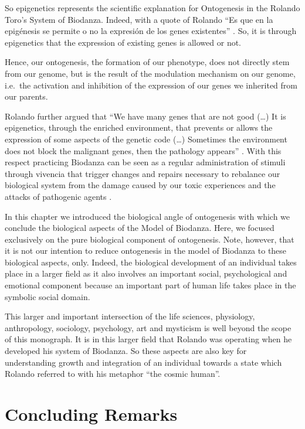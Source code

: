 \documentclass[
  11pt,
]{book}
\begin{document}
So epigenetics represents the scientific explanation for Ontogenesis in the Rolando Toro's System of Biodanza. Indeed, with a quote of Rolando ``Es que en la epigénesis
se permite o no la expresión de los genes existentes'' \citep{Montanari2023}. So, it is through epigenetics that the expression of existing genes is allowed or not.

Hence, our ontogenesis, the formation of our phenotype, does not directly stem from our genome, but is the result of the modulation mechanism on our genome, i.e.~the activation and inhibition of the expression of our genes we inherited from our parents.

Rolando further argued that ``We have many genes that are not good (\ldots) It is epigenetics, through the enriched environment, that prevents or allows the expression of some aspects of the genetic code (\ldots) Sometimes the environment does not block the malignant genes, then the pathology appears'' \citep{Montanari2023}. With this respect practicing Biodanza can be seen as a regular administration of stimuli through vivencia that trigger changes and repairs necessary to rebalance our biological system from the damage caused by our toxic experiences and the attacks of pathogenic agents \citep{Montanari2023}.

In this chapter we introduced the biological angle of ontogenesis with which we conclude the biological aspects of the Model of Biodanza. Here, we focused exclusively on the pure biological component of ontogenesis. Note, however, that it is not our intention to reduce ontogenesis in the model of Biodanza to these biological aspects, only. Indeed, the biological development of an individual takes place in a larger field as it also involves an important social, psychological and emotional component because an important part of human life takes place in the symbolic social domain.

This larger and important intersection of the life sciences, physiology, anthropology, sociology, psychology, art and mysticism is well beyond the scope of this monograph. It is in this larger field that Rolando was operating when he developed his system of Biodanza. So these aspects are also key for understanding growth and integration of an individual towards a state which Rolando referred to with his metaphor ``the cosmic human''.

\hypertarget{concluding-remarks}{%
\chapter{Concluding Remarks}\label{concluding-remarks}}
\end{document}
